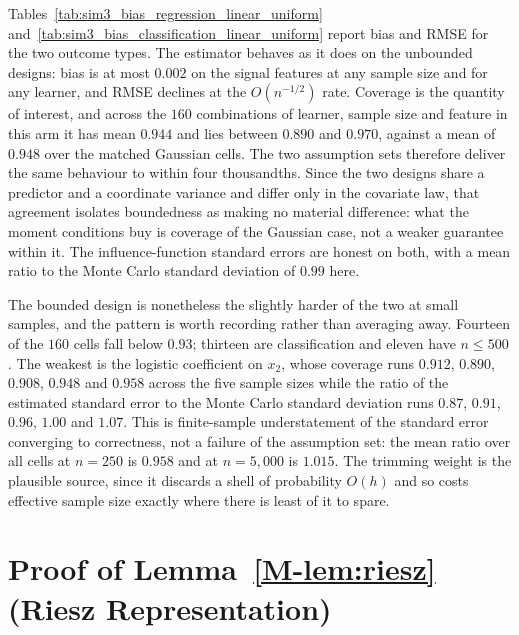 \documentclass[12pt,a4paper]{article}
\numberwithin{equation}{section}
\theoremstyle{plain}
\theoremstyle{definition}
\begin{document}
	Tables~\ref{tab:sim3_bias_regression_linear_uniform} and~\ref{tab:sim3_bias_classification_linear_uniform} report bias and RMSE for the two outcome types. The estimator behaves as it does on the unbounded designs: bias is at most $0.002$ on the signal features at any sample size and for any learner, and RMSE declines at the $O(n^{-1/2})$ rate. Coverage is the quantity of interest, and across the $160$ combinations of learner, sample size and feature in this arm it has mean $0.944$ and lies between $0.890$ and $0.970$, against a mean of $0.948$ over the matched Gaussian cells. The two assumption sets therefore deliver the same behaviour to within four thousandths. Since the two designs share a predictor and a coordinate variance and differ only in the covariate law, that agreement isolates boundedness as making no material difference: what the moment conditions buy is coverage of the Gaussian case, not a weaker guarantee within it. The influence-function standard errors are honest on both, with a mean ratio to the Monte Carlo standard deviation of $0.99$ here.
	
	The bounded design is nonetheless the slightly harder of the two at small samples, and the pattern is worth recording rather than averaging away. Fourteen of the $160$ cells fall below $0.93$; thirteen are classification and eleven have $n \leq 500$. The weakest is the logistic coefficient on $x_2$, whose coverage runs $0.912$, $0.890$, $0.908$, $0.948$ and $0.958$ across the five sample sizes while the ratio of the estimated standard error to the Monte Carlo standard deviation runs $0.87$, $0.91$, $0.96$, $1.00$ and $1.07$. This is finite-sample understatement of the standard error converging to correctness, not a failure of the assumption set: the mean ratio over all cells at $n=250$ is $0.958$ and at $n=5{,}000$ is $1.015$. The trimming weight is the plausible source, since it discards a shell of probability $O(h)$ and so costs effective sample size exactly where there is least of it to spare.
	

	
	\section{Proof of Lemma~\ref{M-lem:riesz} (Riesz Representation)}
	\label{app:lem_riesz}
	
\end{document}
